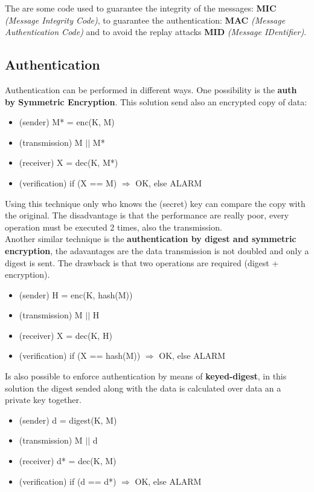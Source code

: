 \documentclass[12pt]{article}
\begin{document}
The are some code used to guarantee the integrity of the messages: \textbf{MIC} \textit{(Message Integrity Code)}, to guarantee the authentication: \textbf{MAC} \textit{(Message Authentication Code)} and to avoid the replay attacks \textbf{MID} \textit{(Message IDentifier)}.

\subsection{Authentication}
Authentication can be performed in different ways. One possibility is the \textbf{auth by Symmetric Encryption}. This solution send also an encrypted copy of data:
\begin{itemize}
  \item (sender) M* = enc(K, M)
  \item (transmission) M $||$ M*
  \item (receiver) X = dec(K, M*)
  \item (verification) if (X == M) $\Rightarrow$ OK, else ALARM
\end{itemize}
Using this technique only who knows the (secret) key can compare the copy with the original. The disadvantage is that the performance are really poor, every operation must be executed 2 times, also the transmission.\\
Another similar technique is the \textbf{authentication by digest and symmetric encryption}, the adavantages are the data transmission is not doubled and only a digest is sent. The drawback is that two operations are required (digest + encryption).
\begin{itemize}
  \item (sender) H = enc(K, hash(M))
  \item (transmission) M $||$ H
  \item (receiver) X = dec(K, H)
  \item (verification) if (X == hash(M)) $\Rightarrow$ OK, else ALARM
\end{itemize}
Is also possible to enforce authentication by means of \textbf{keyed-digest}, in this solution the digest sended along with the data is calculated over data an a private key together.
\begin{itemize}
  \item (sender) d = digest(K, M)
  \item (transmission) M $||$ d
  \item (receiver) d* = dec(K, M)
  \item (verification) if (d == d*) $\Rightarrow$ OK, else ALARM
\end{itemize}
\end{document}
